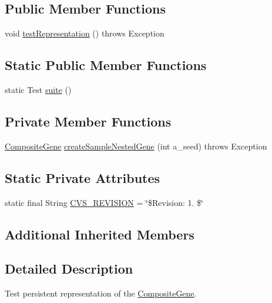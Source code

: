 \subsection*{Public Member Functions}
\begin{DoxyCompactItemize}
\item 
void \hyperlink{classorg_1_1jgap_1_1impl_1_1_composite_gene_persistent_repr_test_ab9a744557875163a267427c566bd68af}{test\-Representation} ()  throws Exception 
\end{DoxyCompactItemize}
\subsection*{Static Public Member Functions}
\begin{DoxyCompactItemize}
\item 
static Test \hyperlink{classorg_1_1jgap_1_1impl_1_1_composite_gene_persistent_repr_test_ac6753a88f71838f09f16aed8c75c6457}{suite} ()
\end{DoxyCompactItemize}
\subsection*{Private Member Functions}
\begin{DoxyCompactItemize}
\item 
\hyperlink{classorg_1_1jgap_1_1impl_1_1_composite_gene}{Composite\-Gene} \hyperlink{classorg_1_1jgap_1_1impl_1_1_composite_gene_persistent_repr_test_a2e6369b8dc50507ba3b4d2cc8de50106}{create\-Sample\-Nested\-Gene} (int a\-\_\-seed)  throws Exception 
\end{DoxyCompactItemize}
\subsection*{Static Private Attributes}
\begin{DoxyCompactItemize}
\item 
static final String \hyperlink{classorg_1_1jgap_1_1impl_1_1_composite_gene_persistent_repr_test_a1c929856e0a0a4189f2aa4882c7f148a}{C\-V\-S\-\_\-\-R\-E\-V\-I\-S\-I\-O\-N} = \char`\"{}\$Revision\-: 1. \$\char`\"{}
\end{DoxyCompactItemize}
\subsection*{Additional Inherited Members}


\subsection{Detailed Description}
Test persistent representation of the \hyperlink{classorg_1_1jgap_1_1impl_1_1_composite_gene}{Composite\-Gene}.


